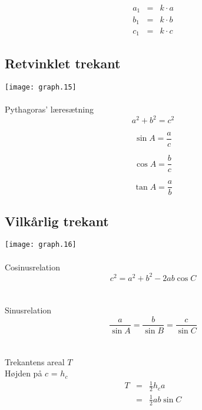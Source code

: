 \documentclass[11pt,a4paper,landscape,twocolumn,fleqn,leqno]{article}
\begin{document}
\begin{eqnarray}
a_1 & = & k \cdot a \\
b_1 & = & k \cdot b \nonumber \\
c_1 & = & k \cdot c \nonumber
\end{eqnarray}

\vfill

\subsection{Retvinklet trekant}

\texttt{[image: graph.15]}
\\
\\
Pythagoras' læresætning 
\begin{equation}
a^2 + b^2 = c^2
\end{equation}

\begin{equation}
\sin A = \frac{a}{c}
\end{equation}

\begin{equation}
\cos A = \frac{b}{c}
\end{equation}

\begin{equation}
\tan A = \frac{a}{b}
\end{equation}

\vfill

\subsection{Vilkårlig trekant}

\texttt{[image: graph.16]}
\\
\\
Cosinusrelation
\begin{equation}
c^2 = a^2 + b^2 - 2ab\cos C
\end{equation}
\\
\\
Sinusrelation
\begin{equation}
\frac{a}{\sin A} = \frac{b}{\sin B} = \frac{c}{\sin C}
\end{equation}
\\
\\
Trekantens areal $T$ \\
Højden på $c$ = $h_c$
\begin{eqnarray}
T & = & \frac{1}{2}h_c a \\
& = & \frac{1}{2}ab\sin C \nonumber
\end{eqnarray}
\end{document}
